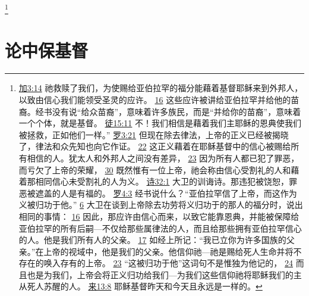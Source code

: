 \documentclass[12pt, a4paper, oneside]{ctexart}
\begin{document}
	\footnote {
		\href{https://biblehub.com/galatians/3-14.htm}{加3:14} 祂救赎了我们，为使赐给亚伯拉罕的福分能藉着基督耶稣来到外邦人，以致由信心我们能领受圣灵的应许。
		\href{https://biblehub.com/galatians/3-16.htm}{16} 这些应许被讲给亚伯拉罕并给他的苗裔。经书没有说“给众苗裔”，意味着许多族民，而是“并给你的苗裔”，意味着一个个体，就是基督。
		\href{https://biblehub.com/acts/15-11.htm}{徒15:11} 不！我们相信是藉着我们主耶稣的恩典使我们被拯救，正如他们一样。”
		\href{https://biblehub.com/romans/3-21.htm}{罗3:21} 但现在除去律法，上帝的正义已经被揭晓了，律法和众先知也向它作证。
		\href{https://biblehub.com/romans/3-22.htm}{22} 这正义藉着在耶稣基督中的信心被赐给所有相信的人。犹太人和外邦人之间没有差异，
		\href{https://biblehub.com/romans/3-23.htm}{23} 因为所有人都已犯了罪恶，而亏欠了上帝的荣耀，
		\href{https://biblehub.com/romans/3-30.htm}{30} 既然惟有一位上帝，祂会称由信心受割礼的人和藉着那相同信心未受割礼的人为义。
		\href{https://biblehub.com/psalms/32-1.htm}{诗32:1} 大卫的训诲诗。那违犯被饶恕，罪恶被遮盖的人是有福的。
		\href{https://biblehub.com/romans/4-3.htm}{罗4:3} 经书说什么？“亚伯拉罕信了上帝，而这作为义被归功于他。”
		\href{https://biblehub.com/romans/4-6.htm}{6} 大卫在谈到上帝除去功劳将义归功于的那人的福分时，说出相同的事情：
		\href{https://biblehub.com/romans/4-16.htm}{16} 因此，那应许由信心而来，以致它能靠恩典，并能被保障给亚伯拉罕的所有后嗣---不仅给那些属律法的人，而且给那些拥有亚伯拉罕信心的人。他是我们所有人的父亲。
		\href{https://biblehub.com/romans/4-17.htm}{17} 如经上所记：“我已立你为许多国族的父亲。”在上帝的视域中，他是我们的父亲。他信仰祂---祂是赐给死人生命并将不存在的唤入存有的上帝。
		\href{https://biblehub.com/romans/4-23.htm}{23} “这被归功于他”这词句不是惟独为他记的，
		\href{https://biblehub.com/romans/4-24.htm}{24} 而且也是为我们，上帝会将正义归功给我们---为我们这些信仰祂将耶稣我们的主从死人苏醒的人。
		\href{https://biblehub.com/hebrews/13-8.htm}{来13:8} 耶稣基督昨天和今天且永远是一样的。
	}

\section{论中保基督}
\end{document}
